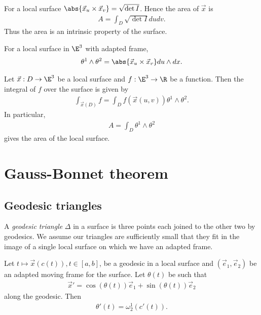 \documentclass{article}
\begin{document}
\begin{lemma}[Notes 14.15]
    For a local surface $\abs{\vec x_u \times \vec x_v}=\sqrt{\det I}$. Hence the area
    of $\vec x$ is
    \begin{align*}
        A = \int_D \sqrt{\det I}dudv.
    \end{align*}
    Thus the area is an intrinsic property of the surface.
\end{lemma}

\begin{lemma}[Notes 14.16]
    For a local surface in $\E^3$ with adapted frame,
    \begin{align*}
        \theta^1\wedge\theta^2 = \abs{\vec x_u \times \vec x_v} du \wedge dx.
    \end{align*}
\end{lemma}

\begin{corollary}[Notes 14.17]
    Let $\vec x: D\to\E^3$ be a local surface and $f:\E^3\to\R$ be a function. Then
    the integral of $f$ over the surface is given by
    \begin{align*}
        \int_{\vec x(D)} f = \int_D f(\vec x(u,v))\theta^1\wedge\theta^2.
    \end{align*}
    In particular,
    \begin{align*}
        A = \int_D \theta^1\wedge\theta^2
    \end{align*}
    gives the area of the local surface.
\end{corollary}

\section{Gauss-Bonnet theorem}

\subsection{Geodesic triangles}

\begin{definition}
    A \emph{geodesic triangle} $\Delta$ in a surface is three points each joined to the other
    two by geodesics. We assume our triangles are sufficiently small that they fit in the image
    of a single local surface on which we have an adapted frame.
\end{definition}

\begin{proposition}[Notes 15.2]
    Let $t\mapsto \vec x(c(t)), t\in[a,b]$, be a geodesic in a local surface and $(\vec e_1, \vec e_2)$
    be an adapted moving frame for the surface. Let $\theta(t)$ be such that
    \begin{align*}
        \vec x' = \cos(\theta(t)) \vec e_1 + \sin(\theta(t)) \vec e_2
    \end{align*}
    along the geodesic. Then
    \begin{align*}
        \theta'(t) = \omega_2^1 (c'(t)).
    \end{align*}
\end{proposition}
\end{document}
